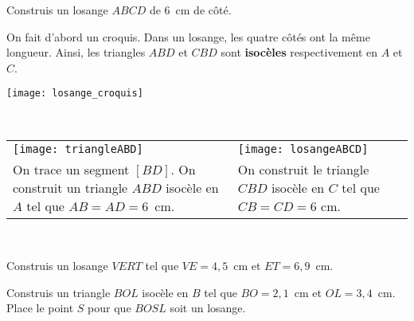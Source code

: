 \begin{methode*1}

\begin{exemple*1}
Construis un losange $ABCD$ de 6 cm de côté.\\[1em]
\begin{minipage}[c]{0.7\linewidth}
On fait d'abord un croquis. Dans un losange, les quatre côtés ont la même longueur. Ainsi, les triangles $ABD$ et $CBD$ sont \textbf{isocèles} respectivement en $A$ et $C$.
 \end{minipage} \hfill%
 \begin{minipage}[c]{0.24\linewidth}
  \texttt{[image: losange\_croquis]}
  \end{minipage} \\
  
\begin{tabularx}{\textwidth}{X|X}
 \qquad \texttt{[image: triangleABD]} & \texttt{[image: losangeABCD]} \\ 
 On trace un segment $[BD]$. On construit un triangle $ABD$ isocèle en $A$ tel que $AB = AD = 6$ cm. & On construit le triangle $CBD$ isocèle en $C$ tel que $CB = CD = 6$ cm. \\
\end{tabularx} \\

 \end{exemple*1}

\exercice
Construis un losange $VERT$ tel que $VE = 4,5$ cm et $ET = 6,9$ cm.

\exercice
Construis un triangle $BOL$ isocèle en $B$ tel que $BO = 2,1$ cm et $OL = 3,4$ cm. Place le point $S$ pour que $BOSL$ soit un losange.

\end{methode*1}


